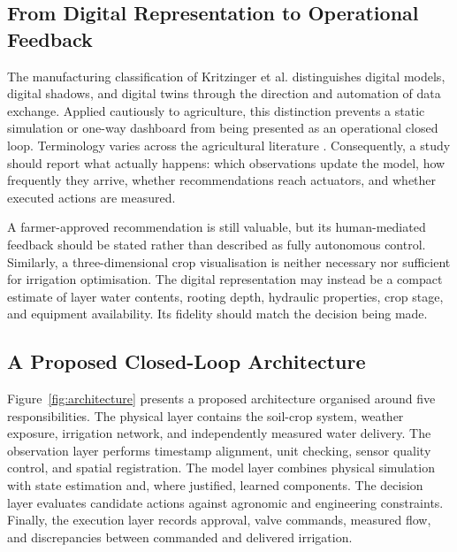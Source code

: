 \documentclass[11pt,a4paper]{article}
\begin{document}
\label{sec:3}

\subsection{From Digital Representation to Operational Feedback}

\label{sec:3-1}

The manufacturing classification of Kritzinger et al. \cite{R05} distinguishes digital models, digital shadows, and digital twins through the direction and automation of data exchange. Applied cautiously to agriculture, this distinction prevents a static simulation or one-way dashboard from being presented as an operational closed loop. Terminology varies across the agricultural literature \cite{R01,R02,R03,R04}. Consequently, a study should report what actually happens: which observations update the model, how frequently they arrive, whether recommendations reach actuators, and whether executed actions are measured.

A farmer-approved recommendation is still valuable, but its human-mediated feedback should be stated rather than described as fully autonomous control. Similarly, a three-dimensional crop visualisation is neither necessary nor sufficient for irrigation optimisation. The digital representation may instead be a compact estimate of layer water contents, rooting depth, hydraulic properties, crop stage, and equipment availability. Its fidelity should match the decision being made.

\subsection{A Proposed Closed-Loop Architecture}

\label{sec:3-2}

Figure~\ref{fig:architecture} presents a proposed architecture organised around five responsibilities. The physical layer contains the soil-crop system, weather exposure, irrigation network, and independently measured water delivery. The observation layer performs timestamp alignment, unit checking, sensor quality control, and spatial registration. The model layer combines physical simulation with state estimation and, where justified, learned components. The decision layer evaluates candidate actions against agronomic and engineering constraints. Finally, the execution layer records approval, valve commands, measured flow, and discrepancies between commanded and delivered irrigation.
\end{document}
